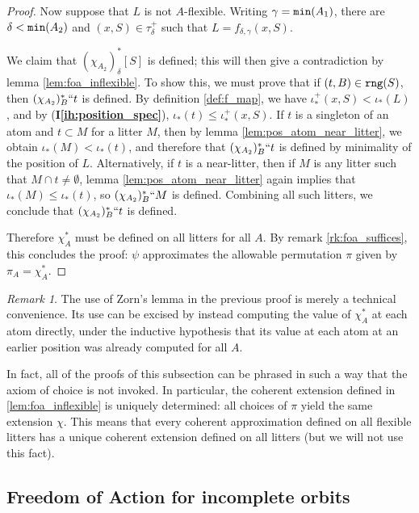 \documentclass{article}
\theoremstyle{definition}
\theoremstyle{remark}
\newtheorem{remark}[theorem]{Remark}
\newcommand{\ihref}[1]{(\textbf{I\ref{#1}})}
\begin{document}
{\begin{proof}
  Now suppose that $L$ is not $A$-flexible.
  Writing $\gamma = {\tt min}(A_1)$, there are $\delta < {\tt min}(A_2)$ and $(x, S) \in \tau_\delta^+$ such that $L = f_{\delta,\gamma}(x, S)$.


  We claim that $(\chi_{A_2})_\delta^*[S]$ is defined; this will then give a contradiction by lemma \ref{lem:foa_inflexible}.
  To show this, we must prove that if $(t, B) \in {\tt rng}(S)$, then $(\chi_{A_2})_B^*``t$ is defined.
  By definition \ref{def:f_map}, we have $\iota_*^+(x, S) < \iota_*(L)$, and by \ihref{ih:position_spec}, $\iota_*(t) \leq \iota_*^+(x, S)$.
  If $t$ is a singleton of an atom and $t \subset M$ for a litter $M$, then by lemma \ref{lem:pos_atom_near_litter}, we obtain $\iota_*(M) < \iota_*(t)$, and therefore that $(\chi_{A_2})_B^*``t$ is defined by minimality of the position of $L$.
  Alternatively, if $t$ is a near-litter, then if $M$ is any litter such that $M \cap t \neq \emptyset$, lemma \ref{lem:pos_atom_near_litter} again implies that $\iota_*(M) \leq \iota_*(t)$, so $(\chi_{A_2})_B^*``M$ is defined.
  Combining all such litters, we conclude that $(\chi_{A_2})_B^*``t$ is defined.

  Therefore $\chi_A^*$ must be defined on all litters for all $A$.
  By remark \ref{rk:foa_suffices}, this concludes the proof: $\psi$ approximates the allowable permutation $\pi$ given by $\pi_A = \chi_A^*$.
\end{proof}
\begin{remark}
  The use of Zorn's lemma in the previous proof is merely a technical convenience.
  Its use can be excised by instead computing the value of \( \chi_A^* \) at each atom directly, under the inductive hypothesis that its value at each atom at an earlier position was already computed for all \( A \).

  In fact, all of the proofs of this subsection can be phrased in such a way that the axiom of choice is not invoked.
  In particular, the coherent extension defined in \ref{lem:foa_inflexible} is uniquely determined: all choices of \( \pi \) yield the same extension \( \chi \).
  This means that every coherent approximation defined on all flexible litters has a unique coherent extension defined on all litters (but we will not use this fact).
\end{remark}

\subsection{Freedom of Action for incomplete orbits}

}
\end{document}
